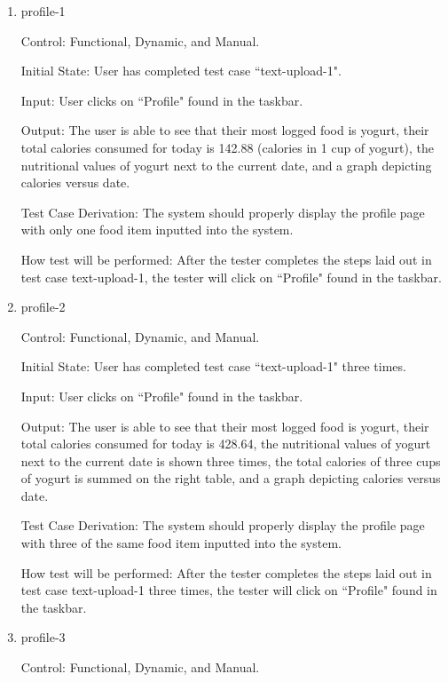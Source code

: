\documentclass[12pt, titlepage]{article}
\begin{document}
	\begin{enumerate}
		\item{profile-1\\}
		
		Control: Functional, Dynamic, and Manual.
		
		Initial State: User has completed test case ``text-upload-1".
		
		Input: User clicks on ``Profile" found in the taskbar.
		
		Output: The user is able to see that their most logged food is yogurt, their total calories consumed for today is 142.88 (calories in 1 cup of yogurt), the nutritional values of yogurt next to the current date, and a graph depicting calories versus date.
		
		Test Case Derivation: The system should properly display the profile page with only one food item inputted into the system.
		
		How test will be performed: After the tester completes the steps laid out in test case text-upload-1, the tester will click on ``Profile" found in the taskbar.
		
		\item{profile-2\\}
		
		Control: Functional, Dynamic, and Manual.
		
		Initial State: User has completed test case ``text-upload-1" three times.
		
		Input: User clicks on ``Profile" found in the taskbar.
		
		Output: The user is able to see that their most logged food is yogurt, their total calories consumed for today is 428.64, the nutritional values of yogurt next to the current date is shown three times, the total calories of three cups of yogurt is summed on the right table, and a graph depicting calories versus date.
		
		Test Case Derivation: The system should properly display the profile page with three of the same food item inputted into the system.
		
		How test will be performed: After the tester completes the steps laid out in test case text-upload-1 three times, the tester will click on ``Profile" found in the taskbar.
		
		\item{profile-3\\}
		
		Control: Functional, Dynamic, and Manual.
		

\end{enumerate}
\end{document}
